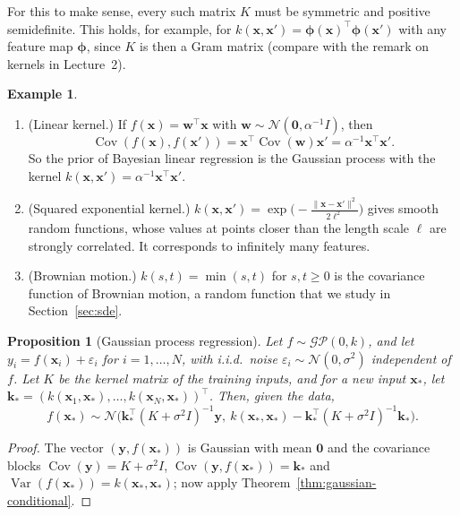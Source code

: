 \documentclass[11pt]{article}
\newcommand{\norm}[1]{\lVert #1 \rVert}
\DeclareMathOperator{\Var}{Var}
\DeclareMathOperator{\Cov}{Cov}
\theoremstyle{definition}
\newtheorem{example}[definition]{Example}
\theoremstyle{plain}
\newtheorem{proposition}[definition]{Proposition}
\theoremstyle{remark}
\begin{document}
For this to make sense, every such matrix $K$ must be symmetric and positive semidefinite. This holds, for example, for $k(\mathbf{x}, \mathbf{x}') = \boldsymbol{\phi}(\mathbf{x})^\top\boldsymbol{\phi}(\mathbf{x}')$ with any feature map $\boldsymbol{\phi}$, since $K$ is then a Gram matrix (compare with the remark on kernels in Lecture~2).

\begin{example}\label{ex:kernels}
    \begin{enumerate}
        \item (Linear kernel.) If $f(\mathbf{x}) = \mathbf{w}^\top\mathbf{x}$ with $\mathbf{w} \sim \mathcal{N}(\mathbf{0}, \alpha^{-1}I)$, then
        \[\Cov(f(\mathbf{x}), f(\mathbf{x}')) = \mathbf{x}^\top\Cov(\mathbf{w})\mathbf{x}' = \alpha^{-1}\mathbf{x}^\top\mathbf{x}'.\]
        So the prior of Bayesian linear regression is the Gaussian process with the kernel $k(\mathbf{x}, \mathbf{x}') = \alpha^{-1}\mathbf{x}^\top\mathbf{x}'$.
        \item (Squared exponential kernel.) $k(\mathbf{x}, \mathbf{x}') = \exp\big(-\frac{\norm{\mathbf{x} - \mathbf{x}'}^2}{2\ell^2}\big)$ gives smooth random functions, whose values at points closer than the length scale $\ell$ are strongly correlated. It corresponds to infinitely many features.
        \item (Brownian motion.) $k(s, t) = \min(s, t)$ for $s, t \geq 0$ is the covariance function of Brownian motion, a random function that we study in Section~\ref{sec:sde}.
    \end{enumerate}
\end{example}

\begin{proposition}[Gaussian process regression]\label{prop:gp-regression}
    Let $f \sim \mathcal{GP}(0, k)$, and let $y_i = f(\mathbf{x}_i) + \varepsilon_i$ for $i = 1, \ldots, N$, with i.i.d.\ noise $\varepsilon_i \sim \mathcal{N}(0, \sigma^2)$ independent of $f$. Let $K$ be the kernel matrix of the training inputs, and for a new input $\mathbf{x}_*$, let $\mathbf{k}_* = (k(\mathbf{x}_1, \mathbf{x}_*), \ldots, k(\mathbf{x}_N, \mathbf{x}_*))^\top$. Then, given the data,
    \[f(\mathbf{x}_*) \sim \mathcal{N}\big(\mathbf{k}_*^\top(K + \sigma^2 I)^{-1}\mathbf{y}, \ k(\mathbf{x}_*, \mathbf{x}_*) - \mathbf{k}_*^\top(K + \sigma^2 I)^{-1}\mathbf{k}_*\big).\]
\end{proposition}

\begin{proof}
    The vector $(\mathbf{y}, f(\mathbf{x}_*))$ is Gaussian with mean $\mathbf{0}$ and the covariance blocks $\Cov(\mathbf{y}) = K + \sigma^2 I$, $\Cov(\mathbf{y}, f(\mathbf{x}_*)) = \mathbf{k}_*$ and $\Var(f(\mathbf{x}_*)) = k(\mathbf{x}_*, \mathbf{x}_*)$; now apply Theorem~\ref{thm:gaussian-conditional}.
\end{proof}
\end{document}

